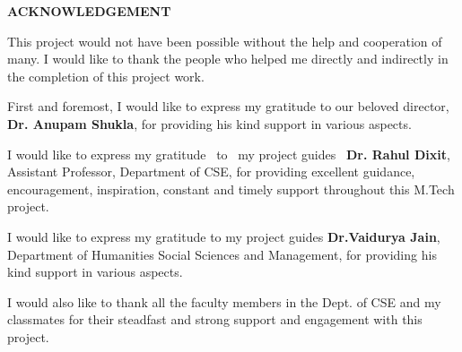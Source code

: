 \begin{center}
\textbf{\textbf{\fontsize{16pt}{24pt}\selectfont ACKNOWLEDGEMENT}}
\end{center}

\vspace{0.3cm}

\fontsize{12pt}{24pt}\selectfont 
This project would not have been possible without the help and cooperation of many. I would like to thank the people who helped me directly and indirectly in the completion of this project work.\par
\hspace{0.3cm}  First and foremost,\hspace{0.1cm} I would like \hspace{0.1cm}  to express \hspace{0.1cm}  my gratitude  \hspace{0.1cm}  to our beloved  \hspace{0.1cm} director,\hspace{0.3cm}  \textbf{Dr. Anupam Shukla}, for providing his kind support in various aspects. \par

I would like to express my gratitude \ to \ my project guides \ \textbf{Dr. Rahul Dixit}, Assistant Professor, Department of CSE, for providing excellent guidance, encouragement, inspiration, constant and timely support throughout this M.Tech project.\par

I would like to express my gratitude to my project guides \textbf{Dr.Vaidurya Jain}, Department of Humanities Social Sciences and Management, for providing his kind support in various aspects.\par
I would also like to thank all the faculty members in the Dept. of CSE and my classmates for their steadfast and strong support and engagement with this project. 
